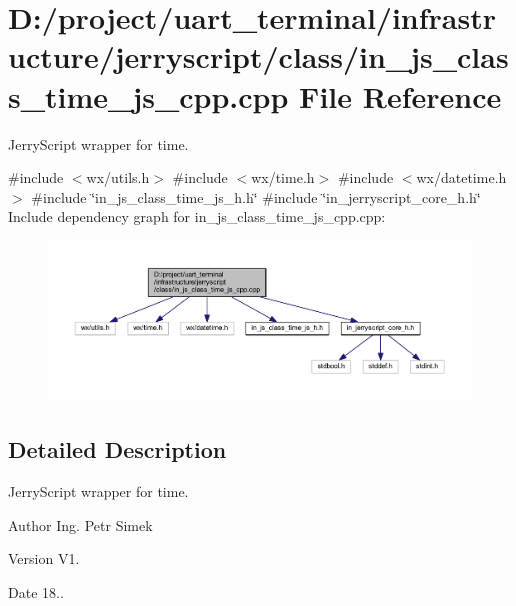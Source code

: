 \section{D\+:/project/uart\+\_\+terminal/infrastructure/jerryscript/class/in\+\_\+js\+\_\+class\+\_\+time\+\_\+js\+\_\+cpp.cpp File Reference}
\label{in__js__class__time__js__cpp_8cpp}


Jerry\+Script wrapper for time.  


{\ttfamily \#include $<$wx/utils.\+h$>$}\newline
{\ttfamily \#include $<$wx/time.\+h$>$}\newline
{\ttfamily \#include $<$wx/datetime.\+h$>$}\newline
{\ttfamily \#include \char`\"{}in\+\_\+js\+\_\+class\+\_\+time\+\_\+js\+\_\+h.\+h\char`\"{}}\newline
{\ttfamily \#include \char`\"{}in\+\_\+jerryscript\+\_\+core\+\_\+h.\+h\char`\"{}}\newline
Include dependency graph for in\+\_\+js\+\_\+class\+\_\+time\+\_\+js\+\_\+cpp.\+cpp\+:
\nopagebreak
\begin{figure}[H]
\begin{center}
\leavevmode
\includegraphics[width=350pt]{in__js__class__time__js__cpp_8cpp__incl}
\end{center}
\end{figure}


\subsection{Detailed Description}
Jerry\+Script wrapper for time. 

\begin{DoxyAuthor}{Author}
Ing. Petr Simek 
\end{DoxyAuthor}
\begin{DoxyVersion}{Version}
V1. 
\end{DoxyVersion}
\begin{DoxyDate}{Date}
18.. 
\end{DoxyDate}
